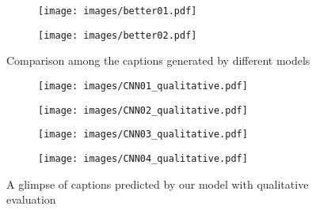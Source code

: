 \documentclass[runningheads]{llncs}
\begin{document}
\begin{figure}[!htbp]
\centering
\begin{subfigure}[b]{\textwidth}
\texttt{[image: images/better01.pdf]}
         \caption{}
         \label{fig:manWorking}
     \end{subfigure}
     \hfill
     \begin{subfigure}[b]{\textwidth}
\texttt{[image: images/better02.pdf]}
         \caption{}
         \label{fig:oldMan}
     \end{subfigure}
        \caption{Comparison among the captions generated by different models}
        \label{comparison}
\end{figure}

\begin{figure}[!htbp]
\centering
\begin{subfigure}[b]{\textwidth}
\texttt{[image: images/CNN01\_qualitative.pdf]}
         \caption{}
         \label{fig: 2per+boat}
     \end{subfigure}
     \hfill
     \begin{subfigure}[b]{\textwidth}
\texttt{[image: images/CNN02\_qualitative.pdf]}
         \caption{}
         \label{fig:child}
     \end{subfigure}
     \hfill
     \begin{subfigure}[b]{\textwidth}
\texttt{[image: images/CNN03\_qualitative.pdf]}
         \caption{}
         \label{fig: 1per+boat}
     \end{subfigure}
     \hfill
     \begin{subfigure}[b]{\textwidth}
\texttt{[image: images/CNN04\_qualitative.pdf]}
         \caption{}
         \label{fig: peopleStanding}
     \end{subfigure}
        \caption{A glimpse of captions predicted by our model with qualitative evaluation}
        \label{samples}
\end{figure}
\end{document}
